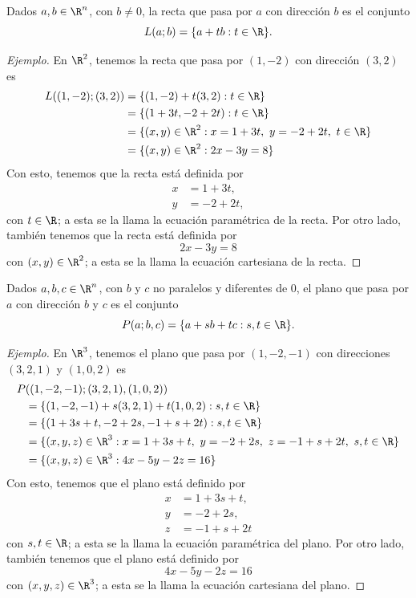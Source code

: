 \documentclass[a4,11pt]{aleph-notas}
\begin{document}
\begin{defi}[Recta de $\R^n$]
    Dados $a,b\in\R^n$, con $b\neq0$, la recta que pasa por $a$ con dirección $b$ es el conjunto
    \[
        L(a;b)=\{a+t b:t\in\R\}.
    \]
\end{defi}

\begin{proof}[Ejemplo]
    En $\R^2$, tenemos la recta que pasa por $(1,-2)$ con dirección $(3,2)$ es
    \begin{align*}
        L((1,-2);(3,2)) 
            & = \{(1,-2)+t(3,2):t \in\R\} \\
            & = \{(1+3t ,-2+2t ): t \in\R\} \\
            & = \{(x,y)\in\R^2: x = 1+3t ,\ y=-2+2t ,\ t \in\R\} \\
            & = \{(x,y)\in\R^2: 2x-3y=8\}
    \end{align*}
    Con esto, tenemos que la recta está definida por
    \begin{align*}
        x& = 1+3t ,\\
        y& = -2+2t ,
    \end{align*}
    con $t \in \R$; a esta se la llama la ecuación paramétrica de la recta. Por otro lado, también tenemos que la recta está definida por 
    \[
        2x-3y=8
    \]
    con $(x,y)\in\R^2$; a esta se la llama la ecuación cartesiana de la recta.
\end{proof}

\begin{defi}[Plano de $\R^n$]
    Dados $a,b,c\in\R^n$, con $b$ y $c$ no paralelos y diferentes de $0$, el plano que pasa por $a$ con dirección $b$ y $c$ es el conjunto
    \[
        P(a;b,c)=\{a+s  b+t c:s ,t \in\R\}.
    \]
\end{defi}

\begin{proof}[Ejemplo]
    En $\R^3$, tenemos el plano que pasa por $(1,-2,-1)$ con direcciones $(3,2,1)$ y $(1,0,2)$ es
    \begin{align*}
        P&((1,-2,-1);(3,2,1),(1,0,2)) \\
            & = \{(1,-2,-1)+s (3,2,1) + t (1,0,2) :s ,t \in\R\} \\
            & = \{(1+3s +t ,-2+2s ,-1+s +2t ): s ,t \in\R\} \\
            & = \{(x,y,z)\in\R^3: x = 1+3s +t ,\ y=-2+2s ,\ z=-1+s +2t ,\ s ,t \in\R\} \\
            & = \{(x,y,z)\in\R^3: 4x-5y-2z=16\}
    \end{align*}
    Con esto, tenemos que el plano está definido por
    \begin{align*}
        x& = 1+3s +t ,\\
        y& = -2+2s ,\\
        z& = -1+s +2t 
    \end{align*}
    con $s ,t \in \R$; a esta se la llama la ecuación paramétrica del plano. Por otro lado, también tenemos que el plano está definido por 
    \[
        4x-5y-2z=16
    \]
    con $(x,y,z)\in\R^3$; a esta se la llama la ecuación cartesiana del plano.
\end{proof}
\end{document}
